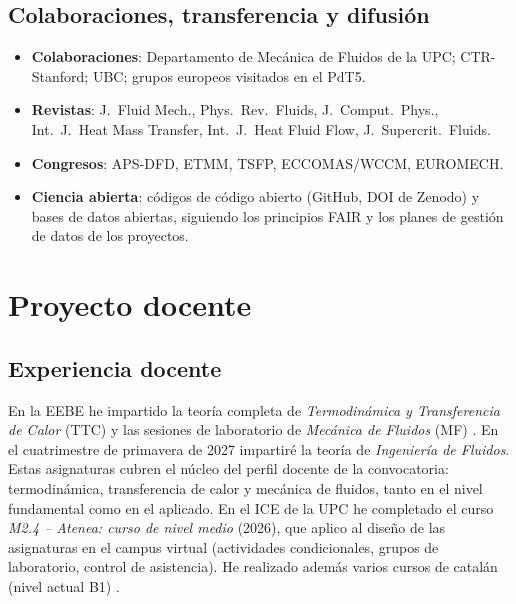 \documentclass[11pt]{article}
\begin{document}
\subsection{Colaboraciones, transferencia y difusión}\label{sec:dissemination}
\begin{itemize}
\item \textbf{Colaboraciones}: Departamento de Mecánica de Fluidos de la UPC; CTR-Stanford;
UBC; grupos europeos visitados en el PdT5. 
\item \textbf{Revistas}: J.\ Fluid Mech., Phys.\ Rev.\ Fluids, J.\ Comput.\ Phys.,
Int.\ J.\ Heat Mass Transfer, Int.\ J.\ Heat Fluid Flow, J.\ Supercrit.\ Fluids.
\item \textbf{Congresos}: APS-DFD, ETMM, TSFP, ECCOMAS/WCCM, EUROMECH.
\item \textbf{Ciencia abierta}: códigos de código abierto (GitHub, DOI de Zenodo) y bases
de datos abiertas, siguiendo los principios FAIR y los planes de gestión de datos de los
proyectos.
\end{itemize}

\section{Proyecto docente}

\subsection{Experiencia docente}
En la EEBE he impartido la teoría completa de \emph{Termodinámica y Transferencia de Calor}
(TTC)  y las sesiones de laboratorio de \emph{Mecánica de
Fluidos} (MF) . En el cuatrimestre de primavera de 2027
impartiré la teoría de \emph{Ingeniería de Fluidos}. Estas asignaturas cubren el núcleo del
perfil docente de la convocatoria: termodinámica, transferencia de calor y mecánica de
fluidos, tanto en el nivel fundamental como en el aplicado. En el ICE de la UPC he
completado el curso \emph{M2.4 -- Atenea: curso de nivel medio} (2026), que aplico al diseño
de las asignaturas en el campus virtual (actividades condicionales, grupos de laboratorio,
control de asistencia). He realizado además varios cursos de
catalán (nivel actual B1) .
\end{document}
